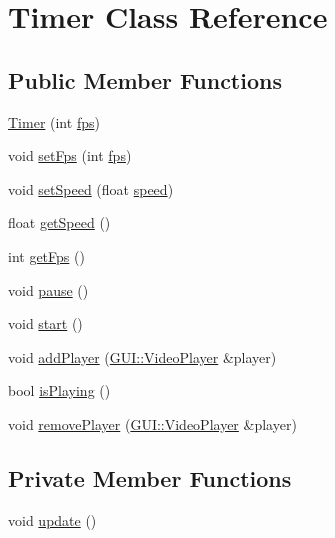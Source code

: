 \hypertarget{classGUI_1_1Timer}{}\section{Timer Class Reference}
\label{classGUI_1_1Timer}
\subsection*{Public Member Functions}
\begin{DoxyCompactItemize}
\item 
\hyperlink{classGUI_1_1Timer_ab333b697b20790f9c540b1c34f1a5eab}{Timer} (int \hyperlink{classGUI_1_1Timer_a45b67662d620a977a2cfe519f7ab6273}{fps})
\item 
void \hyperlink{classGUI_1_1Timer_a9913d8cd6d012c0ecfbc2de831d9d7cd}{set\+Fps} (int \hyperlink{classGUI_1_1Timer_a45b67662d620a977a2cfe519f7ab6273}{fps})
\item 
void \hyperlink{classGUI_1_1Timer_a5466c67c5ec22359c0702dc4ac8ffb19}{set\+Speed} (float \hyperlink{classGUI_1_1Timer_a7f7e4724cf57d59513b39c5ecc81adc8}{speed})
\item 
float \hyperlink{classGUI_1_1Timer_a26ebefde7fe71954e6c1282255951b7d}{get\+Speed} ()
\item 
int \hyperlink{classGUI_1_1Timer_a519ad5c0664b9de28c1a6d9dc77f959d}{get\+Fps} ()
\item 
void \hyperlink{classGUI_1_1Timer_a7167f5c196fc5e167bfabde1a730e81d}{pause} ()
\item 
void \hyperlink{classGUI_1_1Timer_a60de64d75454385b23995437f1d72669}{start} ()
\item 
void \hyperlink{classGUI_1_1Timer_a889aa04afcf41d73482b80e34c8d7439}{add\+Player} (\hyperlink{classGUI_1_1VideoPlayer}{G\+U\+I\+::\+Video\+Player} \&player)
\item 
bool \hyperlink{classGUI_1_1Timer_a8438e3403946accc1986a05b89ee7b03}{is\+Playing} ()
\item 
void \hyperlink{classGUI_1_1Timer_a6b66531935ec5f20b3565dd20a2994d8}{remove\+Player} (\hyperlink{classGUI_1_1VideoPlayer}{G\+U\+I\+::\+Video\+Player} \&player)
\end{DoxyCompactItemize}
\subsection*{Private Member Functions}
\begin{DoxyCompactItemize}
\item 
void \hyperlink{classGUI_1_1Timer_ac5c54df7ed3b930268c8d7752c101725}{update} ()
\end{DoxyCompactItemize}
